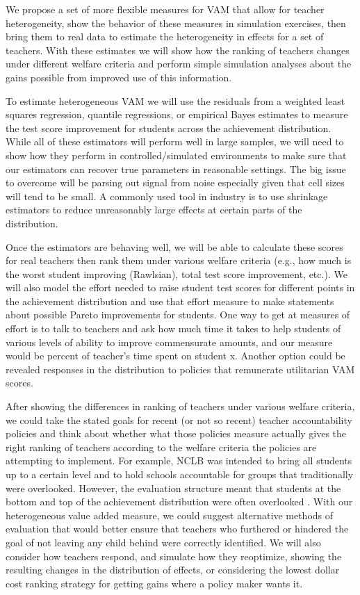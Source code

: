 \documentclass[letterpaper,12pt]{article}
\begin{document}
We propose a set of more flexible measures for VAM that allow for teacher heterogeneity, show the behavior of these measures in simulation exercises, then bring them to real data to estimate the heterogeneity in effects for a set of teachers. With these estimates we will show how the ranking of teachers changes under different welfare criteria and perform simple simulation analyses about the gains possible from improved use of this information.

To estimate heterogeneous VAM we will use the residuals from a weighted least squares regression, quantile regressions, or empirical Bayes estimates to measure the test score improvement for students across the achievement distribution. While all of these estimators will perform well in large samples, we will need to show how they perform in controlled/simulated environments to make sure that our estimators can recover true parameters in reasonable settings. The big issue to overcome will be parsing out signal from noise especially given that cell sizes will tend to be small. A commonly used tool in industry is to use shrinkage estimators to reduce unreasonably large effects at certain parts of the distribution.

Once the estimators are behaving well, we will be able to calculate these scores for real teachers then rank them under various welfare criteria (e.g., how much is the worst student improving (Rawlsian), total test score improvement, etc.). We will also model the effort needed to raise student test scores for different points in the achievement distribution and use that effort measure to make statements about possible Pareto improvements for students. One way to get at measures of effort is to talk to teachers and ask how much time it takes to help students of various levels of ability to improve commensurate amounts, and our measure would be percent of teacher’s time spent on student x. Another option could be revealed responses in the distribution to policies that remunerate utilitarian VAM scores.

After showing the differences in ranking of teachers under various welfare criteria, we could take the stated goals for recent (or not so recent) teacher accountability policies and think about whether what those policies measure actually gives the right ranking of teachers according to the welfare criteria the policies are attempting to implement. For example, NCLB was intended to bring all students up to a certain level and to hold schools accountable for groups that traditionally were overlooked. However, the evaluation structure meant that students at the bottom and top of the achievement distribution were often overlooked \citep{neal2010left}. With our heterogeneous value added measure, we could suggest alternative methods of evaluation that would better ensure that teachers who furthered or hindered the goal of not leaving any child behind were correctly identified. We will also consider how teachers respond, and simulate how they reoptimize, showing the resulting changes in the distribution of effects, or considering the lowest dollar cost ranking strategy for getting gains where a policy maker wants it.
\end{document}

